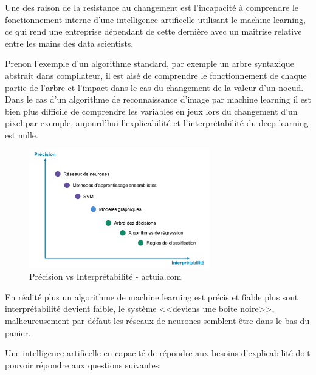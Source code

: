             Une des raison de la resistance au changement est l'incapacité à comprendre 
            le fonctionnement interne d'une intelligence artificelle utilisant le machine learning, 
            ce qui rend une entreprise dépendant de cette dernière avec un maîtrise relative
            entre les mains des data scientists. \newline

            Prenon l'exemple d'un algorithme standard, par exemple un arbre syntaxique abstrait
            dans compilateur, il est aisé de comprendre le fonctionnement de chaque partie 
            de l'arbre et l'impact dans le cas du changement de la valeur d'un noeud.
            Dans le cas d'un algorithme de reconnaissance d'image par machine learning 
            il est bien plus difficile de comprendre les variables en jeux lors du changement 
            d'un pixel par exemple, aujourd'hui l'explicabilité et l'interprétabilité
            du deep learning est nulle. \newline

            \begin{figure}[H]
                \centering
                \includegraphics[width=0.7\textwidth]{Images/accvsint}
                \caption{Précision vs Interprétabilité - actuia.com}
                \label{fig:explicability}
            \end{figure}

            En réalité plus un algorithme de machine learning est précis et fiable 
            plus sont interprétabilité devient faible, le système <<deviens une boite 
            noire>>, malheureusement par défaut les réseaux de neurones semblent 
            être dans le bas du panier. \newline 
            
            Une intelligence artificelle en capacité de répondre aux besoins d'explicabilité 
            doit pouvoir répondre aux questions suivantes: \newline 

